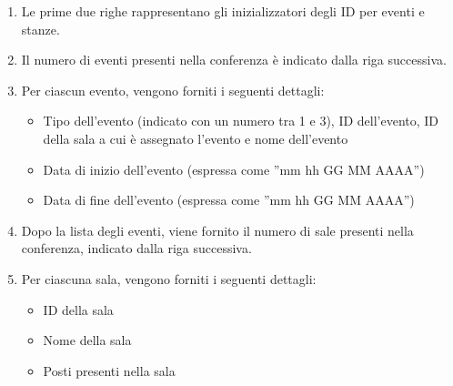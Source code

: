 \documentclass[11pt]{scrartcl} %
\begin{document}
\begin{enumerate}
    \item Le prime due righe rappresentano gli inizializzatori degli ID per eventi e stanze.
    \item Il numero di eventi presenti nella conferenza è indicato dalla riga successiva.
    \item Per ciascun evento, vengono forniti i seguenti dettagli:
    \begin{itemize}
        \item Tipo dell'evento (indicato con un numero tra 1 e 3), ID dell'evento, ID della sala a cui è assegnato l'evento e  nome dell'evento
        \item Data di inizio dell'evento (espressa come ''mm hh GG MM AAAA'')
        \item Data di fine dell'evento (espressa come ''mm hh GG MM AAAA'')
    \end{itemize}
    \item Dopo la lista degli eventi, viene fornito il numero di sale presenti nella conferenza, indicato dalla riga successiva.
    \item Per ciascuna sala, vengono forniti i seguenti dettagli:
    \begin{itemize}
        \item ID della sala
        \item Nome della sala
        \item Posti presenti nella sala
    \end{itemize}
\end{enumerate}
\end{document}
